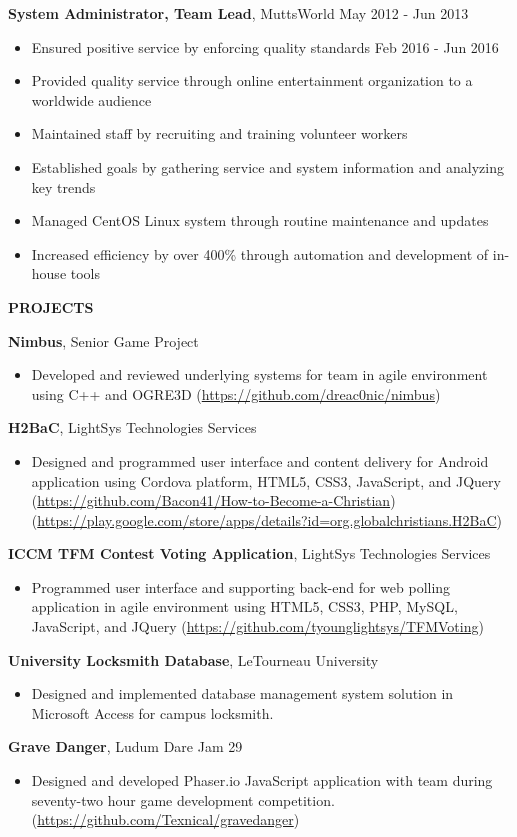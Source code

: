\documentclass[letterpaper]{article}
\newcommand{\altsection}[1]{\noindent\textbf{#1}\smallskip}
\newcommand{\entry}[3]{\textbf{#1}, #2\begin{itemize}[leftmargin=3.5em]#3\end{itemize}\bigskip}
\begin{document}
\entry{System Administrator, Team Lead}{MuttsWorld                             \hfill          May 2012 - Jun 2013}  {
    \item Ensured positive service by enforcing quality standards       \hfill          Feb 2016 - Jun 2016
    \item Provided quality service through online entertainment organization to a worldwide audience
    \item Maintained staff by recruiting and training volunteer workers
    \item Established goals by gathering service and system information and analyzing key trends
    \item Managed CentOS Linux system through routine maintenance and updates
    \item Increased efficiency by over 400\% through automation and development of in-house tools
}

\altsection{PROJECTS}

\entry{Nimbus}{Senior Game Project} {
    \item Developed and reviewed underlying systems for team in agile environment using C++ and OGRE3D (\url{https://github.com/dreac0nic/nimbus})
}

\entry{H2BaC}{LightSys Technologies Services} {
    \item Designed and programmed user interface and content delivery for Android application using Cordova platform, HTML5, CSS3, JavaScript, and JQuery (\url{https://github.com/Bacon41/How-to-Become-a-Christian}) (\url{https://play.google.com/store/apps/details?id=org.globalchristians.H2BaC})
}

\entry{ICCM TFM Contest Voting Application}{LightSys Technologies Services} {
    \item Programmed user interface and supporting back-end for web polling application in agile environment using HTML5, CSS3, PHP, MySQL, JavaScript, and JQuery (\url{https://github.com/tyounglightsys/TFMVoting})
}

\entry{University Locksmith Database}{LeTourneau University} {
    \item Designed and implemented database management system solution in Microsoft Access for campus locksmith.
}

\entry{Grave Danger}{Ludum Dare Jam 29} {
    \item Designed and developed Phaser.io JavaScript application with team during seventy-two hour game development competition. (\url{https://github.com/Texnical/gravedanger})
}
\end{document}
